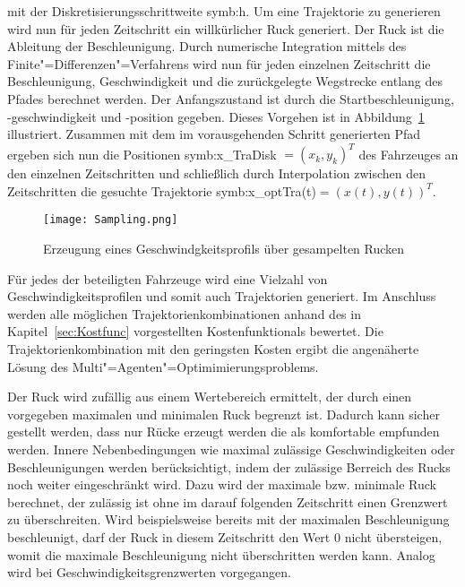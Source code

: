 mit der Diskretisierungsschrittweite \gls{symb:h}.
Um eine Trajektorie zu generieren wird nun f\"ur jeden Zeitschritt ein willk\"urlicher Ruck generiert.
Der Ruck ist die Ableitung der Beschleunigung.
Durch numerische Integration mittels des Finite"=Differenzen"=Verfahrens wird nun f\"ur jeden einzelnen Zeitschritt die Beschleunigung, Geschwindigkeit und die zur\"uckgelegte Wegstrecke entlang des Pfades berechnet werden.
Der Anfangszustand ist durch die Startbeschleunigung, -geschwindigkeit und -position gegeben.
Dieses Vorgehen ist in Abbildung~\ref{fig:Sampling} illustriert.
Zusammen mit dem im vorausgehenden Schritt generierten Pfad ergeben sich nun die Positionen \gls{symb:x_TraDisk} \( = (x_k, y_k)^T\) des Fahrzeuges an den einzelnen Zeitschritten und schlie{\ss}lich durch Interpolation zwischen den Zeitschritten die gesuchte Trajektorie \gls{symb:x_optTra}(t)\(= (x(t), y(t))^T\).

\begin{figure}[!htbp]
    \centering
    \texttt{[image: Sampling.png]}
    \caption[Sampling]{Erzeugung eines Geschwindgkeitsprofils \"uber gesampelten Rucken}
    \label{fig:Sampling}
 \end{figure}

F\"ur jedes der beteiligten Fahrzeuge wird eine Vielzahl von Geschwindigkeitsprofilen und somit auch Trajektorien generiert.
Im Anschluss werden alle m\"oglichen Trajektorienkombinationen anhand des in Kapitel~\ref{sec:Kostfunc} vorgestellten Kostenfunktionals bewertet.
Die Trajektorienkombination mit den geringsten Kosten ergibt die angen\"aherte L\"osung des Multi"=Agenten"=Optimimierungsproblems.

Der Ruck wird zuf\"allig aus einem Wertebereich ermittelt, der durch einen vorgegeben maximalen und minimalen Ruck begrenzt ist.
Dadurch kann sicher gestellt werden, dass nur R\"ucke erzeugt werden die als komfortable empfunden werden.
Innere Nebenbedingungen wie maximal zul\"assige Geschwindigkeiten oder Beschleunigungen werden ber\"ucksichtigt, indem der zul\"assige Berreich des Rucks noch weiter eingeschr\"ankt wird.
Dazu wird der maximale bzw. minimale Ruck berechnet, der zul\"assig ist ohne im darauf folgenden Zeitschritt einen Grenzwert zu \"uberschreiten.
Wird beispielsweise bereits mit der maximalen Beschleunigung beschleunigt, darf der Ruck in diesem Zeitschritt den Wert \(0\) nicht \"ubersteigen, womit die maximale Beschleunigung nicht \"uberschritten werden kann.
Analog wird bei Geschwindigkeitsgrenzwerten vorgegangen.


